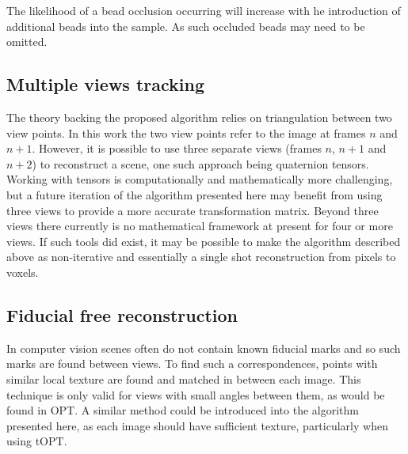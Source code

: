 The likelihood of a bead occlusion occurring will increase with he introduction of additional beads into the sample.
As such occluded beads may need to be omitted. %


\subsection{Multiple views tracking}
The theory backing the proposed algorithm relies on triangulation between two view points.
In this work the two view points refer to the image at frames \(n\) and \(n+1\).
However, it is possible to use three separate views (frames \(n\), \(n+1\) and \(n+2\)) to reconstruct a scene, one such approach being quaternion tensors.
Working with tensors is computationally and mathematically more challenging, but a future iteration of the algorithm presented here may benefit from using three views to provide a more accurate transformation matrix.
Beyond three views there currently is no mathematical framework at present for four or more views.
If such tools did exist, it may be possible to make the algorithm described above as non-iterative and essentially a single shot reconstruction from pixels to voxels.

\subsection{Fiducial free reconstruction}

In computer vision scenes often do not contain known fiducial marks and so such marks are found between views.
To find such a correspondences, points with similar local texture are found and matched in between each image. %
This technique is only valid for views with small angles between them, as would be found in \gls{OPT}.
A similar method could be introduced into the algorithm presented here, as each image should have sufficient texture, particularly when using \gls{tOPT}.

